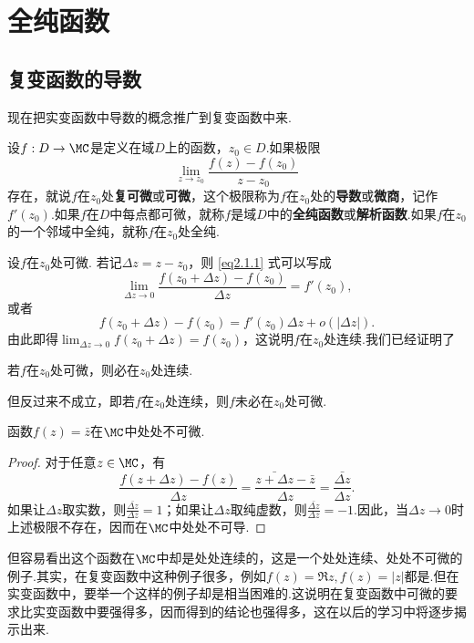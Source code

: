 \setcounter{chapter}{1}
\chapter{全纯函数\label{chap2}}
\section{复变函数的导数\label{sec2.1}}
现在把实变函数中导数的概念推广到复变函数中来.
\begin{definition}
设$f:D\to\MC$是定义在域$D$上的函数，$z_0\in D$.如果极限
\begin{equation}\label{eq2.1.1}
 \lim_{z\to z_0}\frac{f(z)-f(z_0)}{z-z_0}
\end{equation}
存在，就说$f$在$z_0$处\textbf{复可微}或\textbf{可微}，这个极限称为$f$在$z_0$处的\textbf{导数}或\textbf{微商}，记作$f'(z_0)$.如果$f$在$D$中每点都可微，就称$f$是域$D$中的\textbf{全纯函数}或\textbf{解析函数}.如果$f$在$z_0$的一个邻域中全纯，就称$f$在$z_0$处全纯.
\end{definition}

设$f$在$z_0$处可微. 若记$\Delta z=z-z_0$，则 \eqref{eq2.1.1} 式可以写成
\[\lim_{\Delta z\to0}\frac{f(z_0+\Delta z)-f(z_0)}{\Delta z}=f'(z_0),\]
或者
\begin{equation}\label{eq2.1.2}
f(z_0+\Delta z)-f(z_0)=f'(z_0)\Delta z+o(|\Delta z|).
\end{equation}
由此即得$\lim_{\Delta z\to0}f(z_0+\Delta z)=f(z_0)$，这说明$f$在$z_0$处连续.我们已经证明了
\begin{prop}\label{prop2.1.2}
  若$f$在$z_0$处可微，则必在$z_0$处连续.
\end{prop}

但反过来不成立，即若$f$在$z_0$处连续，则$f$未必在$z_0$处可微.

\begin{example}
函数$f(z)=\bar z$在$\MC$中处处不可微.
\end{example}
\begin{proof}
对于任意$z\in\MC$，有
 \[\frac{f(z+\Delta z)-f(z)}{\Delta z}=\frac{\bar{z+\Delta z}-\bar z}{\Delta z}=\frac{\bar{\Delta z}}{\Delta z}.\]
 如果让$\Delta z$取实数，则$\frac{\bar{\Delta z}}{\Delta z}=1$；如果让$\Delta z$取纯虚数，则$\frac{\bar{\Delta z}}{\Delta z}=-1$.因此，当$\Delta z\to0$时上述极限不存在，因而在$\MC$中处处不可导.
\end{proof}

但容易看出这个函数在$\MC$中却是处处连续的，这是一个处处连续、处处不可微的例子.其实，在复变函数中这种例子很多，例如$f(z)=\Re z,f(z)=|z|$都是.但在实变函数中，要举一个这样的例子却是相当困难的.这说明在复变函数中可微的要求比实变函数中要强得多，因而得到的结论也强得多，这在以后的学习中将逐步揭示出来.

